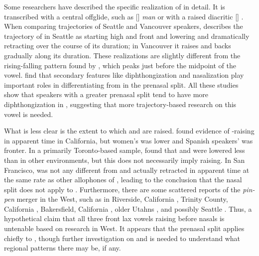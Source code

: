 Some researchers have described the specific realization of \ban in detail. It is transcribed with a central offglide, such as [] \textit{man} \citep[34]{eckert_2008} or with a raised diacritic [] \citep[132]{gordon_2006}. When comparing trajectories of Seattle and Vancouver speakers, \citet{swan_2016_proceedings} describes the trajectory of \ban in Seattle as starting high and front and lowering and dramatically retracting over the course of its duration; in Vancouver it raises and backs gradually along its duration. These realizations are slightly different from the rising-falling pattern found by \citet{mielke_etal_2017}, which peaks just before the midpoint of the vowel. \citet{brotherton_etal_2019} find that secondary features like diphthongization and nasalization play important roles in differentiating \ban from \bat in the prenasal split. All these studies show that speakers with a greater prenasal split tend to have more diphthongization in \ban, suggesting that more trajectory-based research on this vowel is needed.

What is less clear is the extent to which \ben and \bin are raised. \citet[106--107]{holland_2014_diss} found evidence of \ben-raising in apparent time in California, but women’s \ben was lower and Spanish speakers’ was fronter. In a primarily Toronto-based sample, \citet{dedecker_mackenzie_2000} found that \ben and \bin were lowered less than in other environments, but this does not necessarily imply raising. In San Francisco, \bin was not any different from \kit and \ben actually retracted in apparent time at the same rate as other allophones of \dress, leading \citeauthor{cardoso_etal_2016_pads} to the conclusion that the nasal split does not apply to \dress \citep[43--44]{cardoso_etal_2016_pads}. Furthermore, there are some scattered reports of the \textit{pin-pen} merger in the West, such as in Riverside, California \citep[31]{metcalf_1972}, Trinity County, California \citep{geenberg_2014_diss}, Bakersfield, California \citep{warren_fulop_2014}, older Utahns \citep{lillie_1998_thesis}, and possibly Seattle \citep{scanlon_wassink_2010}. Thus, a hypothetical claim that all three front lax vowels raising before nasals is untenable based on research in West. It appears that the prenasal split applies chiefly to \trap, though further investigation on \ben and \bin is needed to understand what regional patterns there may be, if any.

